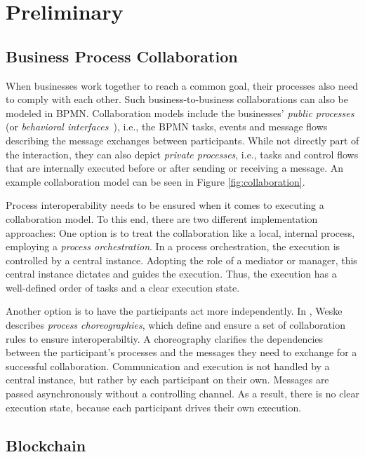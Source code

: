 \documentclass[runningheads]{llncs}
\begin{document}
\section{Preliminary} \label{preliminary}

\subsection{Business Process Collaboration}

When businesses work together to reach a common goal, their processes also need to comply with each other.
Such business-to-business collaborations can also be modeled in BPMN.
Collaboration models include the businesses' \emph{public processes} (or \emph{behavioral interfaces}~\cite{Weske2012}), i.e., the BPMN tasks, events and message flows describing the message exchanges between participants.
While not directly part of the interaction, they can also depict \emph{private processes}, i.e., tasks and control flows that are internally executed before or after sending or receiving a message.
An example collaboration model can be seen in Figure \ref{fig:collaboration}.

Process interoperability needs to be ensured when it comes to executing a collaboration model.
To this end, there are two different implementation approaches:
One option is to treat the collaboration like a local, internal process, employing a \emph{process orchestration}.
In a process orchestration, the execution is controlled by a central instance.
Adopting the role of a mediator or manager, this central instance dictates and guides the execution.
Thus, the execution has a well-defined order of tasks and a clear execution state.

Another option is to have the participants act more independently.
In \cite{Weske2012}, Weske describes \emph{process choreographies}, which define and ensure a set of collaboration rules to ensure interoperabiltiy.
A choreography clarifies the dependencies between the participant's processes and the messages they need to exchange for a successful collaboration.
Communication and execution is not handled by a central instance, but rather by each participant on their own.
Messages are passed asynchronously without a controlling channel.
As a result, there is no clear execution state, because each participant drives their own execution.

\subsection{Blockchain}
\end{document}
